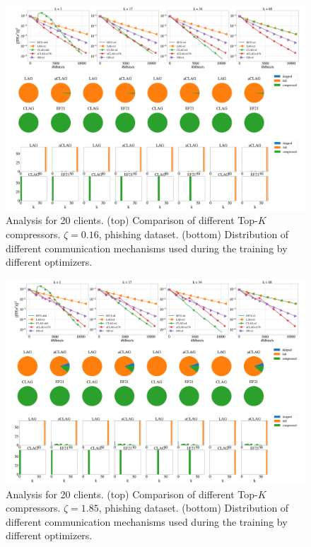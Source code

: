 \documentclass[nohyperref]{article}
\theoremstyle{plain}
\theoremstyle{definition}
\theoremstyle{remark}
\begin{document}
\begin{figure}[!h]
	\centering
	\includegraphics[width=\textwidth]{plots/adaptive/old_4.png}
	\caption{Analysis for 20 clients. (top) Comparison of different  Top-$K$ compressors. $\zeta = 0.16$, phishing dataset. (bottom) Distribution  of different communication mechanisms used during the training by different optimizers.}
	\label{fig:anna-100-nodes-grads_main}
\end{figure}

\begin{figure}[!h]
	\centering
	\includegraphics[width=\textwidth]{plots/adaptive/old_5.png}
	\caption{Analysis for 20 clients. (top) Comparison of different  Top-$K$ compressors. $\zeta = 1.85$, phishing dataset. (bottom) Distribution  of different communication mechanisms used during the training by different optimizers.}
	\label{fig:anna-100-nodes-grads_main}
\end{figure}
\end{document}

